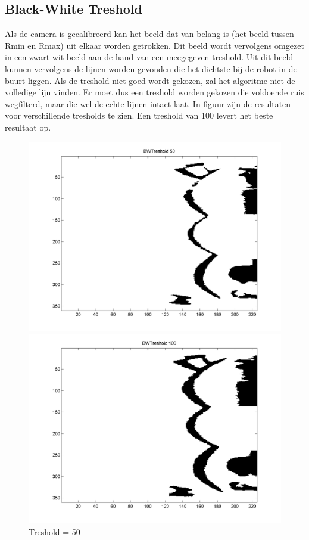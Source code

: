 \documentclass[a4paper]{article}
\begin{document}
\subsection{Black-White Treshold}
Als de camera is gecalibreerd kan het beeld dat van belang is (het beeld tussen Rmin en Rmax) uit elkaar worden getrokken. Dit beeld wordt vervolgens omgezet in een zwart wit beeld aan de hand van een meegegeven treshold. Uit dit beeld kunnen vervolgens de lijnen worden gevonden die het dichtste bij de robot in de buurt liggen. Als de treshold niet goed wordt gekozen, zal het algoritme niet de volledige lijn vinden. Er moet dus een treshold worden gekozen die voldoende ruis wegfilterd, maar die wel de echte lijnen intact laat. In figuur zijn de resultaten voor verschillende tresholds te zien. Een treshold van 100 levert het beste resultaat op.
\begin{figure}[h!]
  \begin{minipage}[b]{0.5\linewidth}
    \centering
    \includegraphics[width=\linewidth]{img/BWTreshold_50.png}
    \caption{Treshold = 50}
    \label{fig:bw50}
  \end{minipage}
  \hspace{0.5cm}
  \begin{minipage}[b]{0.5\linewidth}
    \centering
    \includegraphics[width=\linewidth]{img/BWTreshold_100.png}

\end{minipage}
\end{figure}
\end{document}
